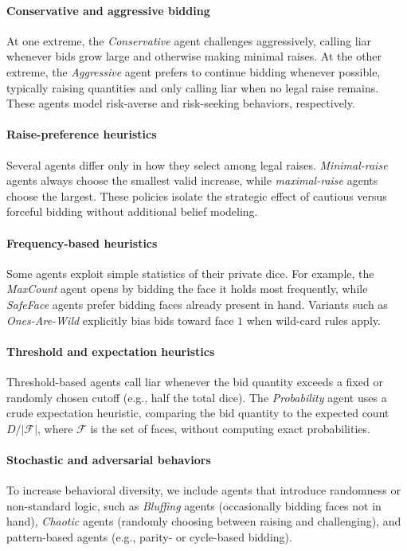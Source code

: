 \paragraph{Conservative and aggressive bidding}
At one extreme, the \emph{Conservative} agent challenges aggressively, calling liar whenever bids grow large and otherwise making minimal raises. At the other extreme, the \emph{Aggressive} agent prefers to continue bidding whenever possible, typically raising quantities and only calling liar when no legal raise remains. These agents model risk-averse and risk-seeking behaviors, respectively.

\paragraph{Raise-preference heuristics}
Several agents differ only in how they select among legal raises. \emph{Minimal-raise} agents always choose the smallest valid increase, while \emph{maximal-raise} agents choose the largest. These policies isolate the strategic effect of cautious versus forceful bidding without additional belief modeling.

\paragraph{Frequency-based heuristics}
Some agents exploit simple statistics of their private dice. For example, the \emph{MaxCount} agent opens by bidding the face it holds most frequently, while \emph{SafeFace} agents prefer bidding faces already present in hand. Variants such as \emph{Ones-Are-Wild} explicitly bias bids toward face \(1\) when wild-card rules apply.

\paragraph{Threshold and expectation heuristics}
Threshold-based agents call liar whenever the bid quantity exceeds a fixed or randomly chosen cutoff (e.g., half the total dice). The \emph{Probability} agent uses a crude expectation heuristic, comparing the bid quantity to the expected count \( D / |\mathcal{F}| \), where \( \mathcal{F} \) is the set of faces, without computing exact probabilities.

\paragraph{Stochastic and adversarial behaviors}
To increase behavioral diversity, we include agents that introduce randomness or non-standard logic, such as \emph{Bluffing} agents (occasionally bidding faces not in hand), \emph{Chaotic} agents (randomly choosing between raising and challenging), and pattern-based agents (e.g., parity- or cycle-based bidding).


